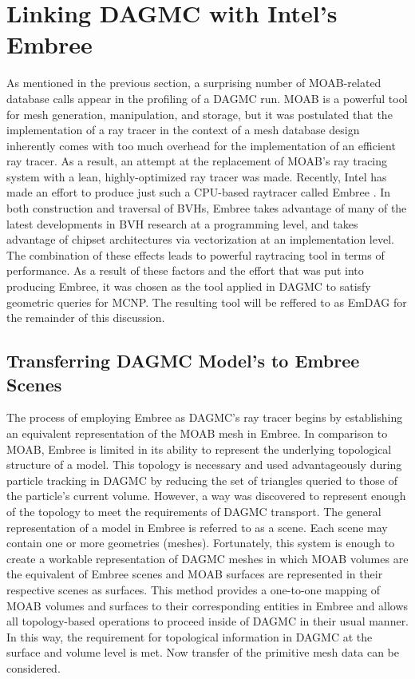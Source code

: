 \documentclass[10pt, a4paper]{article}
\begin{document}
\section{Linking DAGMC with Intel's Embree}%

As mentioned in the previous section, a surprising number of MOAB-related database calls appear in the profiling of a DAGMC run. MOAB is a powerful tool for mesh generation, manipulation, and storage, but it was postulated that the implementation of a ray tracer in the context of a mesh database design inherently comes with too much overhead for the implementation of an efficient ray tracer. As a result, an attempt at the replacement of MOAB's ray tracing system with a lean, highly-optimized ray tracer was made. Recently, Intel has made an effort to produce just such a CPU-based raytracer called Embree \cite{embree}. In both construction and traversal of BVHs, Embree takes advantage of many of the latest developments in BVH research at a programming level, and takes advantage of chipset architectures via vectorization at an implementation level. The combination of these effects leads to powerful raytracing tool in terms of performance. As a result of these factors and the effort that was put into producing Embree, it was chosen as the tool applied in DAGMC to satisfy geometric queries for MCNP. The resulting tool will be reffered to as EmDAG for the remainder of this discussion.

\subsection{Transferring DAGMC Model's to Embree Scenes}%

The process of employing Embree as DAGMC's ray tracer begins by establishing an equivalent representation of the MOAB mesh in Embree. In comparison to MOAB, Embree is limited in its ability to represent the underlying topological structure of a model. This topology is necessary and used advantageously during particle tracking in DAGMC by reducing the set of triangles queried to those of the particle's current volume. However, a way was discovered to represent enough of the topology to meet the requirements of DAGMC transport. The general representation of a model in Embree is referred to as a scene. Each scene may contain one or more geometries (meshes). Fortunately, this system is enough to create a workable representation of DAGMC meshes in which MOAB volumes are the equivalent of Embree scenes and MOAB surfaces are represented in their respective scenes as surfaces. This method provides a one-to-one mapping of MOAB volumes and surfaces to their corresponding entities in Embree and allows all topology-based operations to proceed inside of DAGMC in their usual manner. In this way, the requirement for topological information in DAGMC at the surface and volume level is met. Now transfer of the primitive mesh data can be considered.
\end{document}
